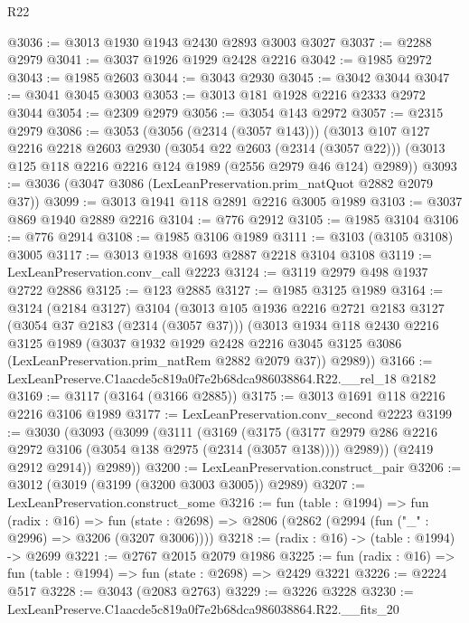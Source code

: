 \begin{lexlean}{R22}
\begin{coremodule}
@3036 := @3013 @1930 @1943 @2430 @2893 @3003 @3027
@3037 := @2288 @2979
@3041 := @3037 @1926 @1929 @2428 @2216
@3042 := @1985 @2972
@3043 := @1985 @2603
@3044 := @3043 @2930
@3045 := @3042 @3044
@3047 := @3041 @3045 @3003
@3053 := @3013 @181 @1928 @2216 @2333 @2972 @3044
@3054 := @2309 @2979
@3056 := @3054 @143 @2972
@3057 := @2315 @2979
@3086 := @3053
    (@3056 (@2314 (@3057 @143)))
    (@3013
      @107
      @127
      @2216
      @2218
      @2603
      @2930
      (@3054 @22 @2603 (@2314 (@3057 @22)))
      (@3013 @125 @118 @2216 @2216 @124 @1989 (@2556 @2979 @46 @124) @2989))
@3093 := @3036 (@3047 @3086 (LexLeanPreservation.prim_natQuot @2882 @2079 @37))
@3099 := @3013 @1941 @118 @2891 @2216 @3005 @1989
@3103 := @3037 @869 @1940 @2889 @2216
@3104 := @776 @2912
@3105 := @1985 @3104
@3106 := @776 @2914
@3108 := @1985 @3106 @1989
@3111 := @3103 (@3105 @3108) @3005
@3117 := @3013 @1938 @1693 @2887 @2218 @3104 @3108
@3119 := LexLeanPreservation.conv_call @2223
@3124 := @3119 @2979 @498 @1937 @2722 @2886
@3125 := @123 @2885
@3127 := @1985 @3125 @1989
@3164 := @3124
    (@2184 @3127)
    @3104
    (@3013
      @105
      @1936
      @2216
      @2721
      @2183
      @3127
      (@3054 @37 @2183 (@2314 (@3057 @37)))
      (@3013
        @1934
        @118
        @2430
        @2216
        @3125
        @1989
        (@3037
          @1932
          @1929
          @2428
          @2216
          @3045
          @3125
          @3086
          (LexLeanPreservation.prim_natRem @2882 @2079 @37))
        @2989))
@3166 := LexLeanPreserve.C1aacde5c819a0f7e2b68dca986038864.R22.__rel_18 @2182
@3169 := @3117 (@3164 (@3166 @2885))
@3175 := @3013 @1691 @118 @2216 @2216 @3106 @1989
@3177 := LexLeanPreservation.conv_second @2223
@3199 := @3030
    (@3093
      (@3099
        (@3111
          (@3169
            (@3175
              (@3177 @2979 @286 @2216 @2972 @3106 (@3054 @138 @2975 (@2314 (@3057 @138))))
              @2989))
          (@2419 @2912 @2914))
        @2989))
@3200 := LexLeanPreservation.construct_pair
@3206 := @3012 (@3019 (@3199 (@3200 @3003 @3005)) @2989)
@3207 := LexLeanPreservation.construct_some
@3216 := fun (table : @1994) =>
  fun (radix : @16) =>
  fun (state : @2698) => @2806 (@2862 (@2994 (fun ("_" : @2996) => @3206 (@3207 @3006))))
@3218 := (radix : @16) -> (table : @1994) -> @2699
@3221 := @2767 @2015 @2079 @1986
@3225 := fun (radix : @16) => fun (table : @1994) => fun (state : @2698) => @2429 @3221
@3226 := @2224 @517
@3228 := @3043 (@2083 @2763)
@3229 := @3226 @3228
@3230 := LexLeanPreserve.C1aacde5c819a0f7e2b68dca986038864.R22.__fits_20

\end{coremodule}
\end{lexlean}
